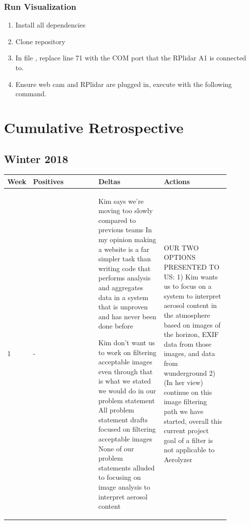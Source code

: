 \documentclass[onecolumn, draftclsnofoot,10pt, compsoc]{IEEEtran}
\begin{document}
\begin{singlespace}
		\subsubsection{Run Visualization}
		\begin{enumerate}
			\item Install all dependencies
			\item Clone repository
				\subitem {}
			\item In file , replace line 71  with the COM port that the RPlidar A1 is connected to.
			\item Ensure web cam and RPlidar are plugged in, execute with the following command.
				\subitem {}
		\end{enumerate}

	\clearpage

	\section{Cumulative Retrospective}
		\subsection{Winter 2018}
		\begin{longtable}{|l|p{0.3\linewidth}|p{0.3\linewidth}|p{0.3\linewidth}|}\hline \textbf{Week} & \textbf{Positives} & \textbf{Deltas} & \textbf{Actions}\\\hline
		1 	&
			-
			&
				Kim says we're moving too slowly compared to previous teams
				In my opinion making a website is a far simpler task than writing code that performs analysis  and aggregates data in a system that is unproven and has never been done before

				Kim don't want us to work on filtering acceptable images even through that is what we stated we would do in our problem statement
				All problem statement drafts focused on filtering acceptable images
				None of our problem statements alluded to focusing on image analysis to interpret aerosol content
			&
				OUR TWO OPTIONS PRESENTED TO US:
				1) Kim wants us to focus on a system to interpret aerosol content in the atmosphere based on images of the horizon, EXIF data from those images, and data from wunderground
				2) (In her view) continue on this image filtering path we have started, overall this current project goal of a filter is not applicable to Aerolyzer


\end{longtable}
\end{singlespace}
\end{document}
